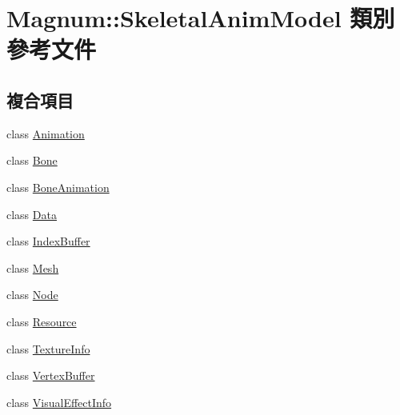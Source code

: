 \hypertarget{class_magnum_1_1_skeletal_anim_model}{}\section{Magnum\+:\+:Skeletal\+Anim\+Model 類別 參考文件}
\label{class_magnum_1_1_skeletal_anim_model}
\subsection*{複合項目}
\begin{DoxyCompactItemize}
\item 
class \hyperlink{class_magnum_1_1_skeletal_anim_model_1_1_animation}{Animation}
\item 
class \hyperlink{class_magnum_1_1_skeletal_anim_model_1_1_bone}{Bone}
\item 
class \hyperlink{class_magnum_1_1_skeletal_anim_model_1_1_bone_animation}{Bone\+Animation}
\item 
class \hyperlink{class_magnum_1_1_skeletal_anim_model_1_1_data}{Data}
\item 
class \hyperlink{class_magnum_1_1_skeletal_anim_model_1_1_index_buffer}{Index\+Buffer}
\item 
class \hyperlink{class_magnum_1_1_skeletal_anim_model_1_1_mesh}{Mesh}
\item 
class \hyperlink{class_magnum_1_1_skeletal_anim_model_1_1_node}{Node}
\item 
class \hyperlink{class_magnum_1_1_skeletal_anim_model_1_1_resource}{Resource}
\item 
class \hyperlink{class_magnum_1_1_skeletal_anim_model_1_1_texture_info}{Texture\+Info}
\item 
class \hyperlink{class_magnum_1_1_skeletal_anim_model_1_1_vertex_buffer}{Vertex\+Buffer}
\item 
class \hyperlink{class_magnum_1_1_skeletal_anim_model_1_1_visual_effect_info}{Visual\+Effect\+Info}
\end{DoxyCompactItemize}

